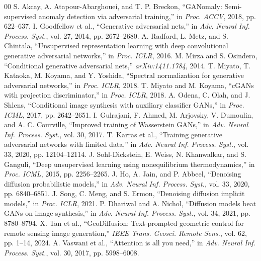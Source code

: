 \documentclass[journal]{IEEEtran}
\begin{document}
\begin{thebibliography}{00}
 S. Akcay, A. Atapour-Abarghouei, and T. P. Breckon, ``GANomaly: Semi-supervised anomaly detection via adversarial training,'' in \textit{Proc. ACCV}, 2018, pp. 622--637.
 I. Goodfellow et al., ``Generative adversarial nets,'' in \textit{Adv. Neural Inf. Process. Syst.}, vol. 27, 2014, pp. 2672--2680.
 A. Radford, L. Metz, and S. Chintala, ``Unsupervised representation learning with deep convolutional generative adversarial networks,'' in \textit{Proc. ICLR}, 2016.
 M. Mirza and S. Osindero, ``Conditional generative adversarial nets,'' \textit{arXiv:1411.1784}, 2014.
 T. Miyato, T. Kataoka, M. Koyama, and Y. Yoshida, ``Spectral normalization for generative adversarial networks,'' in \textit{Proc. ICLR}, 2018.
 T. Miyato and M. Koyama, ``cGANs with projection discriminator,'' in \textit{Proc. ICLR}, 2018.
 A. Odena, C. Olah, and J. Shlens, ``Conditional image synthesis with auxiliary classifier GANs,'' in \textit{Proc. ICML}, 2017, pp. 2642--2651.
 I. Gulrajani, F. Ahmed, M. Arjovsky, V. Dumoulin, and A. C. Courville, ``Improved training of Wasserstein GANs,'' in \textit{Adv. Neural Inf. Process. Syst.}, vol. 30, 2017.
 T. Karras et al., ``Training generative adversarial networks with limited data,'' in \textit{Adv. Neural Inf. Process. Syst.}, vol. 33, 2020, pp. 12104--12114.
 J. Sohl-Dickstein, E. Weiss, N. Khanwalkar, and S. Ganguli, ``Deep unsupervised learning using nonequilibrium thermodynamics,'' in \textit{Proc. ICML}, 2015, pp. 2256--2265.
 J. Ho, A. Jain, and P. Abbeel, ``Denoising diffusion probabilistic models,'' in \textit{Adv. Neural Inf. Process. Syst.}, vol. 33, 2020, pp. 6840--6851.
 J. Song, C. Meng, and S. Ermon, ``Denoising diffusion implicit models,'' in \textit{Proc. ICLR}, 2021.
 P. Dhariwal and A. Nichol, ``Diffusion models beat GANs on image synthesis,'' in \textit{Adv. Neural Inf. Process. Syst.}, vol. 34, 2021, pp. 8780--8794.
 X. Tan et al., ``GeoDiffusion: Text-prompted geometric control for remote sensing image generation,'' \textit{IEEE Trans. Geosci. Remote Sens.}, vol. 62, pp. 1--14, 2024.
 A. Vaswani et al., ``Attention is all you need,'' in \textit{Adv. Neural Inf. Process. Syst.}, vol. 30, 2017, pp. 5998--6008.

\end{thebibliography}
\end{document}
